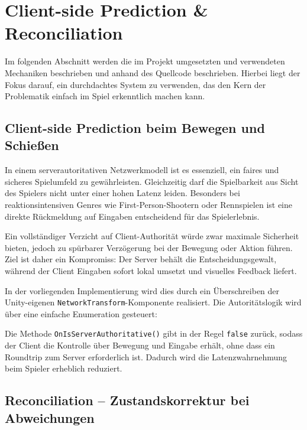 \chapter{Client-side Prediction \& Reconciliation}
Im folgenden Abschnitt werden die im Projekt umgesetzten und verwendeten Mechaniken beschrieben und anhand des Quellcode beschrieben.
Hierbei liegt der Fokus darauf, ein durchdachtes System zu verwenden, das den Kern der Problematik einfach im Spiel erkenntlich machen kann. 

\section{Client-side Prediction beim Bewegen und Schießen}

In einem serverautoritativen Netzwerkmodell ist es essenziell, ein faires und sicheres Spielumfeld zu gewährleisten. Gleichzeitig darf die Spielbarkeit aus Sicht des Spielers nicht unter einer hohen Latenz leiden. Besonders bei reaktionsintensiven Genres wie First-Person-Shootern oder Rennspielen ist eine direkte Rückmeldung auf Eingaben entscheidend für das Spielerlebnis.

Ein vollständiger Verzicht auf Client-Authorität würde zwar maximale Sicherheit bieten, jedoch zu spürbarer Verzögerung bei der Bewegung oder Aktion führen. Ziel ist daher ein Kompromiss: Der Server behält die Entscheidungsgewalt, während der Client Eingaben sofort lokal umsetzt und visuelles Feedback liefert.

\newpage
In der vorliegenden Implementierung wird dies durch ein Überschreiben der Unity-eigenen \texttt{NetworkTransform}-Komponente realisiert. Die Autoritätslogik wird über eine einfache Enumeration gesteuert:




Die Methode \texttt{OnIsServerAuthoritative()} gibt in der Regel \texttt{false} zurück, sodass der Client die Kontrolle über Bewegung und Eingabe erhält, ohne dass ein Roundtrip zum Server erforderlich ist. Dadurch wird die Latenzwahrnehmung beim Spieler erheblich reduziert.


\newpage
\section{Reconciliation – Zustandskorrektur  bei Abweichungen}

